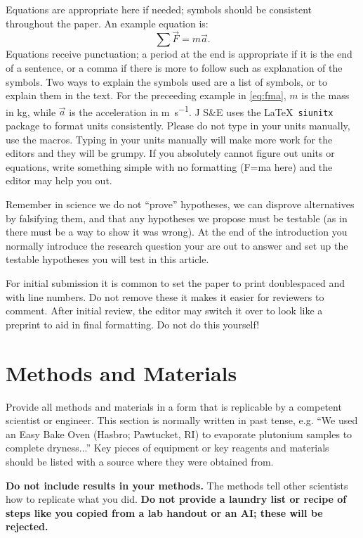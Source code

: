 \documentclass[10pt,draftcls,journal,onecolumn]{IEEEtran}
\begin{document}
Equations are appropriate here if needed; symbols should be consistent throughout the paper. An example equation is:
\begin{equation}
\sum \vec{F} = m \vec{a}.
\label{eq:fma} %
\end{equation}
Equations receive punctuation; a period at the end is appropriate if it is the end of a sentence, or a comma if there is more to follow such as explanation of the symbols. Two ways to explain the symbols used are a list of symbols, or to explain them in the text. For the preceeding example in \cref{eq:fma}, $m$ is the mass in \unit{\kilo\gram}, while $\vec{a}$ is the acceleration in \unit{\meter\per\second}. J S\&E uses the \LaTeX\ \texttt{siunitx} package to format units consistently. Please do not type in your units manually, use the macros. Typing in your units manually will make more work for the editors and they will be grumpy. If you absolutely cannot figure out units or equations, write something simple with no formatting (F=ma here) and the editor may help you out. 

Remember in science we do not ``prove'' hypotheses, we can disprove alternatives by falsifying them, and that any hypotheses we propose must be testable (as in there must be a way to show it was wrong). At the end of the introduction you normally introduce the research question your are out to answer and set up the testable hypotheses you will test in this article. 

For initial submission it is common to set the paper to print doublespaced and with line numbers. Do not remove these it makes it easier for reviewers to comment. After initial review, the editor may switch it over to look like a preprint to aid in final formatting. Do not do this yourself! 






\section{Methods and Materials}
Provide all methods and materials in a form that is replicable by a competent scientist or engineer. This section is normally written in past tense, e.g. ``We used an Easy Bake Oven (Hasbro; Pawtucket, RI) to evaporate plutonium samples to complete dryness...'' Key pieces of equipment or key reagents and materials should be listed with a source where they were obtained from. 

\textbf{Do not include results in your methods.} The methods tell other scientists how to replicate what you did. \textbf{Do not provide a laundry list or recipe of steps like you copied from a lab handout or an AI; these will be rejected.} 
\end{document}
